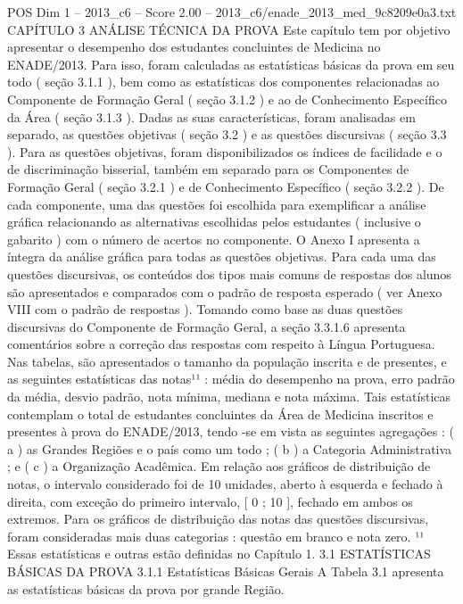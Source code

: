 \begin{textsample}{POS Dim 1 – 2013\_c6 – Score 2.00 – 2013\_c6/enade\_2013\_med\_9c8209e0a3.txt}  \label{ex:f1_pos_172}
CAPÍTULO 3 ANÁLISE TÉCNICA DA PROVA Este capítulo tem por objetivo apresentar o desempenho dos estudantes concluintes de Medicina no ENADE/2013.
Para isso, foram calculadas as estatísticas básicas da prova em seu todo ( seção 3.1.1 ), bem como as estatísticas dos componentes relacionadas ao Componente de Formação Geral ( seção 3.1.2 ) e ao de Conhecimento Específico da Área ( seção 3.1.3 ).
Dadas as suas características, foram analisadas em separado, as questões objetivas ( seção 3.2 ) e as questões discursivas ( seção 3.3 ).
Para as questões objetivas, foram disponibilizados os índices de facilidade e o de discriminação bisserial, também em separado para os Componentes de Formação Geral ( seção 3.2.1 ) e de Conhecimento Específico ( seção 3.2.2 ).
De cada componente, uma das questões foi escolhida para exemplificar a análise gráfica relacionando as alternativas escolhidas pelos estudantes ( inclusive o gabarito ) com o número de acertos no componente.
O Anexo I apresenta a íntegra da análise gráfica para todas as questões objetivas.
Para cada uma das questões discursivas, os conteúdos dos tipos mais comuns de respostas dos alunos são apresentados e comparados com o padrão de resposta esperado ( ver Anexo VIII com o padrão de respostas ).
Tomando como base as duas questões discursivas do Componente de Formação Geral, a seção 3.3.1.6 apresenta comentários sobre a correção das respostas com respeito à Língua Portuguesa.
Nas tabelas, são apresentados o tamanho da população inscrita e de presentes, e as seguintes estatísticas das notas¹¹ : média do desempenho na prova, erro padrão da média, desvio padrão, nota mínima, mediana e nota máxima.
Tais estatísticas contemplam o total de estudantes concluintes da Área de Medicina inscritos e presentes à prova do ENADE/2013, tendo -se em vista as seguintes agregações : ( a ) as Grandes Regiões e o país como um todo ; ( b ) a Categoria Administrativa ; e ( c ) a Organização Acadêmica.
Em relação aos gráficos de distribuição de notas, o intervalo considerado foi de 10 unidades, aberto à esquerda e fechado à direita, com exceção do primeiro intervalo, [ 0 ; 10 ], fechado em ambos os extremos.
Para os gráficos de distribuição das notas das questões discursivas, foram consideradas mais duas categorias : questão em branco e nota zero. ¹¹ Essas estatísticas e outras estão definidas no Capítulo 1. 3.1 ESTATÍSTICAS BÁSICAS DA PROVA 3.1.1 Estatísticas Básicas Gerais A Tabela 3.1 apresenta as estatísticas básicas da prova por grande Região.

\end{textsample}
